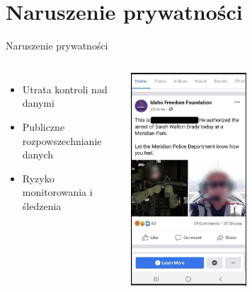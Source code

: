 \section{Naruszenie prywatności}
\begin{frame}{Naruszenie prywatności}
\begin{columns}[c]
    \begin{itemize}
      \item Utrata kontroli nad danymi
      \item Publiczne rozpowszechnianie danych
      \item Ryzyko monitorowania i śledzenia
    \end{itemize}
    \centering
    \includegraphics[width=0.5\textwidth]{images/officer.jpg}
\end{columns}
\end{frame}

